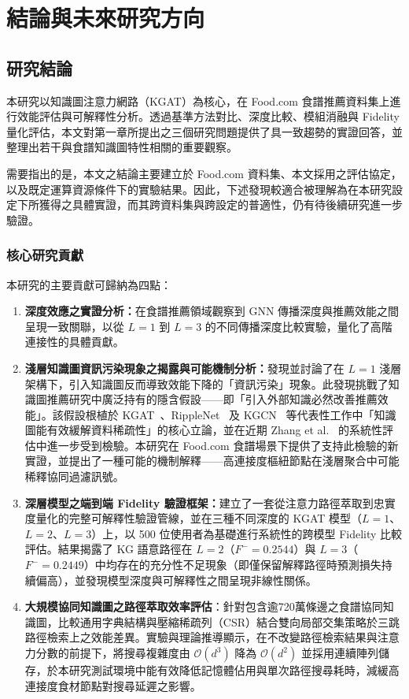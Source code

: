 
\chapter{結論與未來研究方向}

\section{研究結論}

本研究以知識圖注意力網路（KGAT）為核心，在 Food.com 食譜推薦資料集上進行效能評估與可解釋性分析。透過基準方法對比、深度比較、模組消融與 Fidelity 量化評估，本文對第一章所提出之三個研究問題提供了具一致趨勢的實證回答，並整理出若干與食譜知識圖特性相關的重要觀察。

需要指出的是，本文之結論主要建立於 Food.com 資料集、本文採用之評估協定，以及既定運算資源條件下的實驗結果。因此，下述發現較適合被理解為在本研究設定下所獲得之具體實證，而其跨資料集與跨設定的普適性，仍有待後續研究進一步驗證。

\subsection*{核心研究貢獻}

本研究的主要貢獻可歸納為四點：

\begin{enumerate}[leftmargin=2em]
  \item \textbf{深度效應之實證分析：}在食譜推薦領域觀察到 GNN 傳播深度與推薦效能之間呈現一致關聯，以從 $L{=}1$ 到 $L{=}3$ 的不同傳播深度比較實驗，量化了高階連接性的具體貢獻。
  \item \textbf{淺層知識圖資訊污染現象之揭露與可能機制分析：}發現並討論了在 $L{=}1$ 淺層架構下，引入知識圖反而導致效能下降的「資訊污染」現象。此發現挑戰了知識圖推薦研究中廣泛持有的隱含假設——即「引入外部知識必然改善推薦效能」。該假設根植於 KGAT~\cite{wang2019kgat}、RippleNet~\cite{wang2018ripplenet} 及 KGCN~\cite{wang2019kgcn} 等代表性工作中「知識圖能有效緩解資料稀疏性」的核心立論，並在近期 Zhang et al.~\cite{zhang2024kg4receval} 的系統性評估中進一步受到檢驗。本研究在 Food.com 食譜場景下提供了支持此檢驗的新實證，並提出了一種可能的機制解釋——高連接度樞紐節點在淺層聚合中可能稀釋協同過濾訊號。
  \item \textbf{深層模型之端到端 Fidelity 驗證框架：}建立了一套從注意力路徑萃取到忠實度量化的完整可解釋性驗證管線，並在三種不同深度的 KGAT 模型（$L{=}1$、$L{=}2$、$L{=}3$）上，以 500 位使用者為基礎進行系統性的跨模型 Fidelity 比較評估。結果揭露了 KG 語意路徑在 $L{=}2$（$F^- = 0.2544$）與 $L{=}3$（$F^- = 0.2449$）中均存在的充分性不足現象（即僅保留解釋路徑時預測損失持續偏高），並發現模型深度與可解釋性之間呈現非線性關係。
  \item \textbf{大規模協同知識圖之路徑萃取效率評估}：針對包含逾720萬條邊之食譜協同知識圖，比較通用字典結構與壓縮稀疏列（CSR）結合雙向局部交集策略於三跳路徑檢索上之效能差異。實驗與理論推導顯示，在不改變路徑檢索結果與注意力分數的前提下，將搜尋複雜度由 $\mathcal{O}(d^3)$ 降為 $\mathcal{O}(d^2)$ 並採用連續陣列儲存，於本研究測試環境中能有效降低記憶體佔用與單次路徑搜尋耗時，減緩高連接度食材節點對搜尋延遲之影響。
\end{enumerate}


